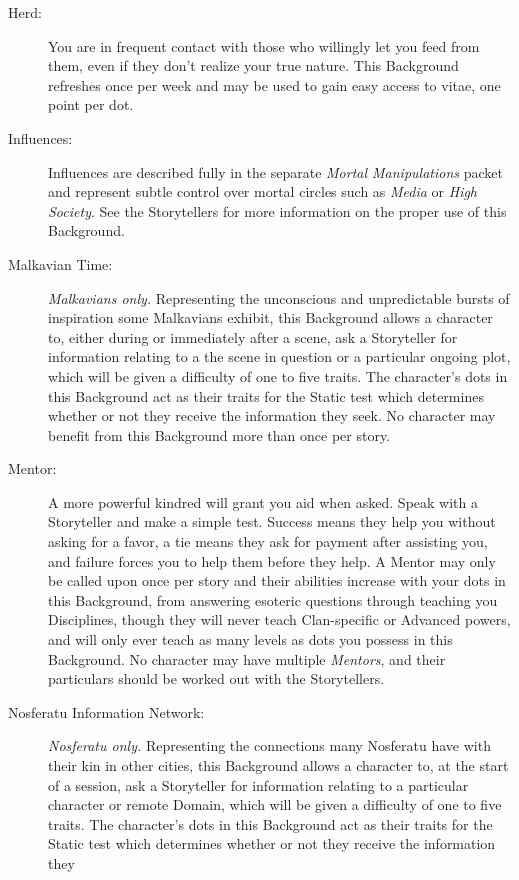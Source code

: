 \begin{description}
	\item[Herd:]  You are in frequent contact with those who willingly let you feed from them, 
	even if they don't realize your true nature.  This Background refreshes once per week and may 
	be used to gain easy access to vitae, one point per dot.
	\item[Influences:]  Influences are described fully in the separate 	\emph{Mortal Manipulations} 
	packet and represent subtle control over mortal circles such as \emph{Media} or \emph{High Society}.  
	See the Storytellers for more information on the proper use of this Background.
	\item[Malkavian Time:] \emph{Malkavians only.} Representing the unconscious and unpredictable bursts 
	of inspiration some Malkavians exhibit, this Background allows a character to, either during or 
	immediately after a scene, ask a Storyteller for information relating to a the scene in question or 
	a particular ongoing plot, which will be given a difficulty of one to five traits.  The character's 
	dots in this Background act as their traits for the Static test which determines whether or not they 
	receive the information they seek.  No character may benefit from this Background more than once per 
	story.
	\item[Mentor:]  A more powerful kindred will grant you aid when asked.  
	Speak with a Storyteller and make a simple test.  Success means they help 
	you without asking for a favor, a tie means they ask for payment after assisting you, 
	and failure forces you to help them before they help.  A Mentor may only 
	be called upon once per story and their abilities increase with your dots 
	in this Background, from answering esoteric questions through teaching you 
	Disciplines, though they will never teach Clan-specific or Advanced powers, and 
	will only ever teach as many levels as dots you possess in this Background.  No character may 
	have multiple \emph{Mentors}, and their particulars should be worked out with the Storytellers.
	\item[Nosferatu Information Network:] \emph{Nosferatu only.} Representing the connections many 
	Nosferatu have with their kin in other cities, this Background allows a character to, at the start 
	of a session, ask a Storyteller for information relating to a particular character or remote Domain, 
	which will be given a difficulty of one to five traits.  The character's dots in this Background act 
	as their traits for the Static test which determines whether or not they receive the information they 

\end{description}
